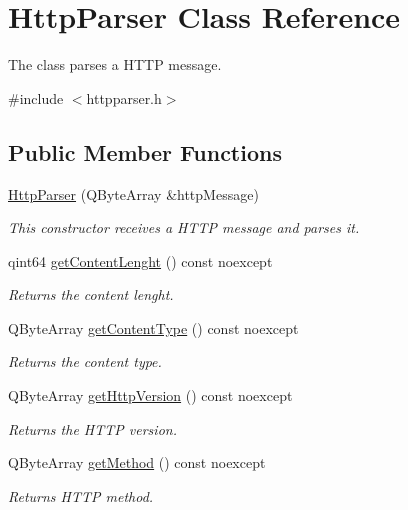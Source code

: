 \hypertarget{class_http_parser}{}\section{Http\+Parser Class Reference}
\label{class_http_parser}


The class parses a H\+T\+TP message.  




{\ttfamily \#include $<$httpparser.\+h$>$}

\subsection*{Public Member Functions}
\begin{DoxyCompactItemize}
\item 
\hyperlink{class_http_parser_a91e6c1876337b53694347476f277d1a2}{Http\+Parser} (Q\+Byte\+Array \&http\+Message)
\begin{DoxyCompactList}\small\item\em This constructor receives a H\+T\+TP message and parses it. \end{DoxyCompactList}\item 
qint64 \hyperlink{class_http_parser_a3feddc6667494af792866935f4ccf794}{get\+Content\+Lenght} () const noexcept
\begin{DoxyCompactList}\small\item\em Returns the content lenght. \end{DoxyCompactList}\item 
Q\+Byte\+Array \hyperlink{class_http_parser_ae17e4400169606e640fda4be21a5421b}{get\+Content\+Type} () const noexcept
\begin{DoxyCompactList}\small\item\em Returns the content type. \end{DoxyCompactList}\item 
Q\+Byte\+Array \hyperlink{class_http_parser_a58b5506be135040e9c1c1aa84be3090a}{get\+Http\+Version} () const noexcept
\begin{DoxyCompactList}\small\item\em Returns the H\+T\+TP version. \end{DoxyCompactList}\item 
Q\+Byte\+Array \hyperlink{class_http_parser_a307aeb76a3a03ab84f3ae090038760ba}{get\+Method} () const noexcept
\begin{DoxyCompactList}\small\item\em Returns H\+T\+TP method. \end{DoxyCompactList}\item 

\end{DoxyCompactItemize}
